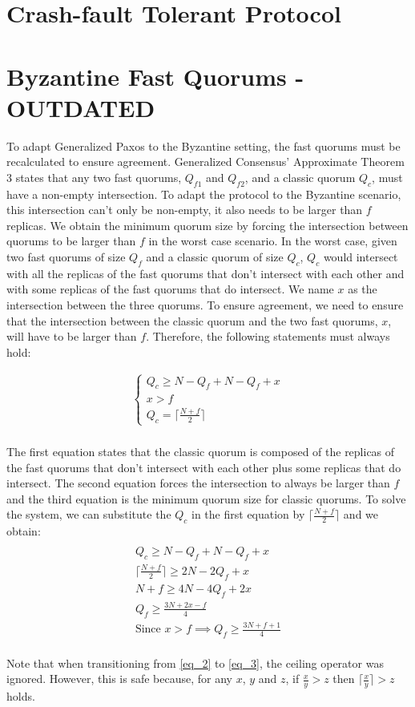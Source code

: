 \section{Crash-fault Tolerant Protocol}
\label{app:cft}



\clearpage
\section{Byzantine Fast Quorums - OUTDATED}
To adapt Generalized Paxos to the Byzantine setting, the fast quorums must be recalculated to ensure agreement. Generalized Consensus' Approximate Theorem 3 states that any two fast quorums, $Q_{f1}$ and $Q_{f2}$, and a classic quorum $Q_c$, must have a non-empty intersection. To adapt the protocol to the Byzantine scenario, this intersection can't only be non-empty, it also needs to be larger than $f$ replicas. We obtain the minimum quorum size by forcing the intersection between quorums to be larger than $f$ in the worst case scenario. In the worst case, given two fast quorums of size $Q_f$ and a classic quorum of size $Q_c$, $Q_c$ would intersect with all the replicas of the fast quorums that don't intersect with each other and with some replicas of the fast quorums that do intersect. We name $x$ as the intersection between the three quorums. To ensure agreement, we need to ensure that the intersection between the classic quorum and the two fast quorums, $x$, will have to be larger than $f$. Therefore, the following statements must always hold:

\begin{gather*}
\begin{cases}
Q_c \geq N - Q_f + N-Q_f + x \\
x > f \\
Q_c = \lceil \frac{N+f}{2}\rceil
\end{cases} \\ 
\end{gather*}

The first equation states that the classic quorum is composed of the replicas of the fast quorums that don't intersect with each other plus some replicas that do intersect. The second equation forces the intersection to always be larger than $f$ and the third equation is the minimum quorum size for classic quorums. To solve the system, we can substitute the $Q_c$ in the first equation by $\lceil \frac{N+f}{2}\rceil$ and we obtain:
\begin{gather*} \\
Q_c \geq N - Q_f + N-Q_f + x \label{eq_1} \tag{1} \\ 
\lceil\frac{N+f}{2}\rceil \geq 2N - 2Q_f + x \label{eq_2} \tag{2} \\
N+f \geq 4N - 4Q_f + 2x \label{eq_3} \tag{3} \\
Q_f \geq \frac{3N+2x-f}{4} \label{eq_4} \tag{4} \\ 
\text{Since $x > f$} \implies Q_f \geq \frac{3N+f+1}{4} \label{eq_5} \tag{5}  \\
\end{gather*}

Note that when transitioning from \eqref{eq_2} to \eqref{eq_3}, the ceiling operator was ignored. However, this is safe because, for any $x$, $y$ and $z$, if $\frac{x}{y} > z$ then $\lceil \frac{x}{y} \rceil > z$ holds.\par

